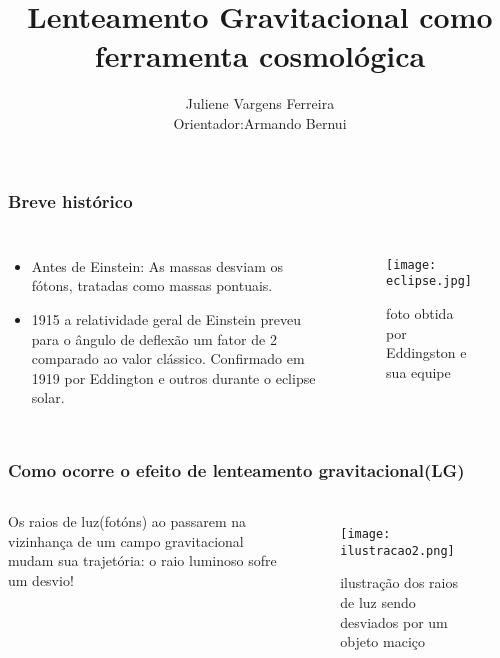 \documentclass[11pt]{beamer}
\begin{document}
	\author{Juliene Vargens Ferreira\\Orientador:Armando Bernui}
	
	\title{Lenteamento Gravitacional como ferramenta cosmológica}
		
	
	\begin{frame}[plain]
		\maketitle
	\end{frame}
			
\begin{frame}
	\frametitle{Breve histórico}
	\begin{columns}
		\begin{itemize}
			\item Antes de Einstein: As massas desviam os fótons, tratadas como massas pontuais.
			\item 1915 a relatividade geral de Einstein preveu para o ângulo de deflexão  um fator de 2 comparado ao valor clássico. Confirmado em 1919 por Eddington e outros durante o eclipse solar.
		\end{itemize}
		\begin{figure}
			\texttt{[image: eclipse.jpg]}
			\caption{foto obtida por Eddingston e sua equipe}
			\label{figura1}
			\centering
		\end{figure}
	\end{columns}
\end{frame}

\begin{frame}
	\frametitle{Como ocorre o efeito de lenteamento gravitacional(LG)}
	\begin{columns}
		\column{0.4\textwidth}
		Os raios de luz(fotóns) ao passarem  na vizinhança de um campo gravitacional   mudam sua trajetória: o raio luminoso  sofre um desvio!
		\column{0.6\textwidth}
		\begin{figure}
			\texttt{[image: ilustracao2.png]}
			\caption{ilustração dos raios de luz sendo desviados por um objeto maciço}
			\label{figura2}
			\centering
		\end{figure}
	\end{columns}
\end{frame}
\end{document}
